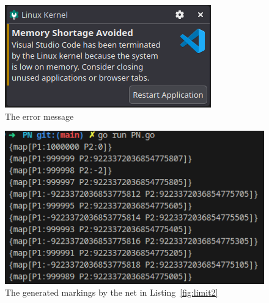 \documentclass[12pt]{article}
\begin{document}
    \begin{figure}[htbp]
        \centering
        \includegraphics[width=\linewidth/2]{Error_message.png}  %
        \caption{The error message}
        \label{fig:error}
    \end{figure}
      
    \begin{figure}[p]  %
        \centering
        
    \end{figure}

    \begin{figure}[htbp]
        \centering
        \includegraphics[width=\linewidth/3 *2]{Marking.png}  %
        \caption{The generated markings by the net in Listing~\ref{fig:limit2}}
        \label{fig:markings}
    \end{figure}

    \begin{figure}[p]  %
        \centering
        
    \end{figure}
\end{document}
